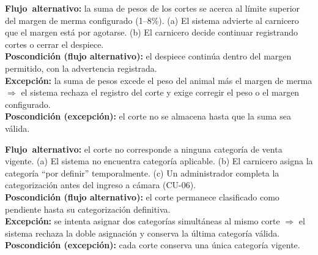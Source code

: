 \documentclass[11pt,a4paper]{article}
\begin{document}
\noindent\textbf{\mbox{Flujo alternativo}:} la suma de pesos de los cortes se acerca al límite superior del margen de merma configurado (1--8\%). (a) El sistema advierte al carnicero que el margen está por agotarse. (b) El carnicero decide continuar registrando cortes o cerrar el despiece.\\
\textbf{Poscondición (flujo alternativo):} el despiece continúa dentro del margen permitido, con la advertencia registrada.\\
\noindent\textbf{\mbox{Excepción}:} la suma de pesos excede el peso del animal más el margen de merma $\Rightarrow$ el sistema rechaza el registro del corte y exige corregir el peso o el margen configurado.\\
\textbf{Poscondición (excepción):} el corte no se almacena hasta que la suma sea válida.
\vspace{0.35cm}

\noindent\textbf{\mbox{Flujo alternativo}:} el corte no corresponde a ninguna categoría de venta vigente. (a) El sistema no encuentra categoría aplicable. (b) El carnicero asigna la categoría ``por definir'' temporalmente. (c) Un administrador completa la categorización antes del ingreso a cámara (CU-06).\\
\textbf{Poscondición (flujo alternativo):} el corte permanece clasificado como pendiente hasta su categorización definitiva.\\
\noindent\textbf{\mbox{Excepción}:} se intenta asignar dos categorías simultáneas al mismo corte $\Rightarrow$ el sistema rechaza la doble asignación y conserva la última categoría válida.\\
\textbf{Poscondición (excepción):} cada corte conserva una única categoría vigente.
\vspace{0.35cm}
\end{document}
